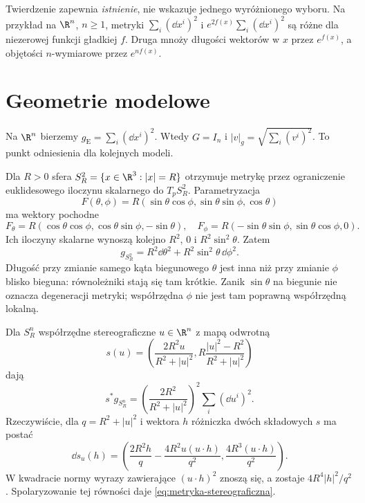 Twierdzenie zapewnia \emph{istnienie}, nie wskazuje
jednego wyróżnionego wyboru. Na przykład na $\R^n$, $n\geq1$,
metryki $\sum_i(\dd x^i)^2$ i
$e^{2f(x)}\sum_i(\dd x^i)^2$ są różne dla
niezerowej funkcji gładkiej $f$. Druga mnoży
długości wektorów w $x$ przez $e^{f(x)}$,
a objętości $n$-wymiarowe przez $e^{nf(x)}$.


\section{Geometrie modelowe}
\label{sec:metryki-modelowe}

\begin{przyklad}
Na $\R^n$ bierzemy $g_{\mathrm E}=\sum_i(\dd x^i)^2$.
Wtedy $G=I_n$ i $|v|_g=\sqrt{\sum_i(v^i)^2}$.
To punkt odniesienia dla kolejnych modeli.
\end{przyklad}

\begin{przyklad}[Sfera]
\label{prz:metryka-sfery}
Dla $R>0$ sfera $S_R^2=\{x\in\R^3:|x|=R\}$ otrzymuje
metrykę przez ograniczenie euklidesowego iloczynu
skalarnego do $T_pS_R^2$. Parametryzacja
\[
 F(\theta,\phi)
 =R(\sin\theta\cos\phi,\sin\theta\sin\phi,\cos\theta)
\]
ma wektory pochodne
\[
 F_\theta
 =R(\cos\theta\cos\phi,\cos\theta\sin\phi,-\sin\theta),
 \quad
 F_\phi
 =R(-\sin\theta\sin\phi,\sin\theta\cos\phi,0).
\]
Ich iloczyny skalarne wynoszą kolejno
$R^2$, $0$ i $R^2\sin^2\theta$. Zatem
\begin{equation}\label{eq:metryka-sfery}
 g_{S_R^2}=R^2\dd\theta^2
       +R^2\sin^2\theta\,\dd\phi^2.
\end{equation}
Długość przy zmianie samego kąta biegunowego
$\theta$ jest inna niż przy zmianie $\phi$ blisko
bieguna: równoleżniki stają się tam krótkie.
Zanik $\sin\theta$ na biegunie nie oznacza
degeneracji metryki; współrzędna $\phi$ nie jest
tam poprawną współrzędną lokalną.

Dla $S_R^n$ współrzędne stereograficzne $u\in\R^n$
z mapą odwrotną
\[
 s(u)=\left(\frac{2R^2u}{R^2+|u|^2},
            R\frac{|u|^2-R^2}{R^2+|u|^2}\right)
\]
dają
\begin{equation}\label{eq:metryka-stereograficzna}
 s^*g_{S_R^n}
 =\left(\frac{2R^2}{R^2+|u|^2}\right)^2
   \sum_i(\dd u^i)^2.
\end{equation}
Rzeczywiście, dla $q=R^2+|u|^2$ i wektora $h$
różniczka dwóch składowych $s$ ma postać
\[
 \dd s_u(h)=
 \left(\frac{2R^2h}{q}
       -\frac{4R^2u(u\cdot h)}{q^2},
       \frac{4R^3(u\cdot h)}{q^2}\right).
\]
W kwadracie normy wyrazy zawierające
$(u\cdot h)^2$ znoszą się, a zostaje
$4R^4|h|^2/q^2$. Spolaryzowanie tej
równości daje \eqref{eq:metryka-stereograficzna}.
\end{przyklad}

